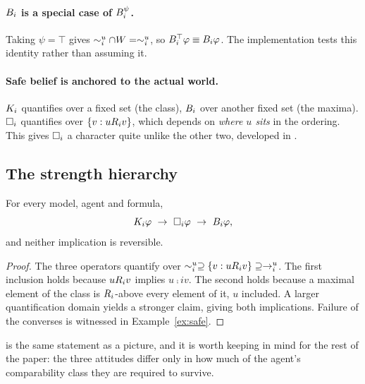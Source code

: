 \documentclass[11pt,a4paper]{article}
\begin{document}
\paragraph{$B_{i}$ is a special case of $B^{\psi}_{i}$.}
Taking $\psi = \top$ gives $\sim_{i}^{u} \cap W = \sim_{i}^{u}$, so
$B^{\top}_{i}\varphi \equiv B_{i}\varphi$. The implementation tests this identity rather
than assuming it.

\paragraph{Safe belief is anchored to the actual world.}
$K_{i}$ quantifies over a fixed set (the class), $B_{i}$ over another fixed set (the
maxima). $\Box_{i}$ quantifies over $\{v : u R_{i} v\}$, which depends on \emph{where $u$
sits} in the ordering. This gives $\Box_{i}$ a character quite unlike the other two, developed
in .

\subsection{The strength hierarchy}

\begin{theorem}[Hierarchy]
\label{thm:hierarchy}
For every model, agent and formula,
\[
  \Kop{i}\varphi \ \rightarrow\ \Sop{i}\varphi \ \rightarrow\ \Bop{i}\varphi ,
\]
and neither implication is reversible.
\end{theorem}

\begin{proof}
The three operators quantify over $\sim_{i}^{u} \supseteq \{v : u R_{i} v\} \supseteq
\rightarrow_{i}^{u}$. The first inclusion holds because $u R_{i} v$ implies $u \comp{i} v$. The
second holds because a maximal element of the class is $R_{i}$-above every element of it,
$u$ included. A larger quantification domain yields a stronger claim, giving both
implications. Failure of the converses is witnessed in Example~\ref{ex:safe}.
\end{proof}

 is the same statement as a picture, and it is worth keeping in mind for
the rest of the paper: the three attitudes differ only in how much of the agent's
comparability class they are required to survive.
\end{document}
